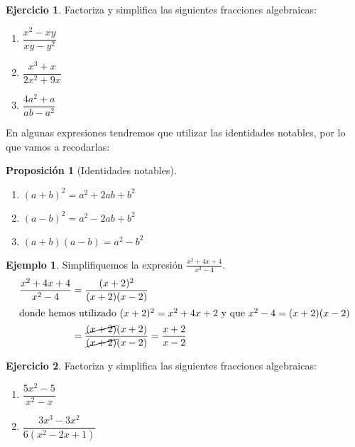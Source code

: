 \documentclass[13pt]{scrartcl}
\newtheorem{proposicion}[teorema]{Proposici\'on}
\theoremstyle{definition}
\newtheorem{ejemplo}{Ejemplo}
\newtheorem{ejercicio}{Ejercicio}
\begin{document}
\begin{ejercicio} Factoriza y simplifica las siguientes fracciones algebraicas:
\begin{multicols}{3}
\begin{enumerate}
\item[a)]$\dfrac{x^2-xy}{xy-y^2}$
\item[b)]$\dfrac{x^3+x}{2x^2+9x}$
\item[c)]$\dfrac{4a^2+a}{ab-a^2}$
\end{enumerate}
\end{multicols}
\end{ejercicio}

\bigskip

En algunas expresiones tendremos que utilizar las identidades notables, por lo que vamos a recodarlas:

\begin{proposicion}[Identidades notables]\label{iden} $ $
\begin{enumerate}
	\item[i)] $(a+b)^2=a^2+2ab+b^2$
	\item[ii)] $(a-b)^2=a^2-2ab+b^2$
	\item[iii)] $(a+b)(a-b)=a^2-b^2$
\end{enumerate}
\end{proposicion}

\begin{ejemplo} Simplifiquemos la expresión $\frac{x^2+4x+4}{x^2-4}$.
\begin{align*}
\frac{x^2+4x+4}{x^2-4}&=\frac{(x+2)^2}{(x+2)(x-2)} \\
\intertext{donde hemos utilizado $(x+2)^2=x^2+4x+2$ y que $x^2-4=(x+2)(x-2)$}
&=\frac{\cancel{(x+2)}(x+2)}{\cancel{(x+2)}(x-2)}=\frac{x+2}{x-2}
\end{align*}
\end{ejemplo}

\pagebreak[4]

\begin{ejercicio} Factoriza y simplifica las siguientes fracciones algebraicas:
\begin{multicols}{3}
\begin{enumerate}
\item[a)]$\dfrac{5x^2-5}{x^2-x}$
\item[b)]$\dfrac{3x^3-3x^2}{6(x^2-2x+1)}$
\end{enumerate}
\end{multicols}
\end{ejercicio}
\end{document}
